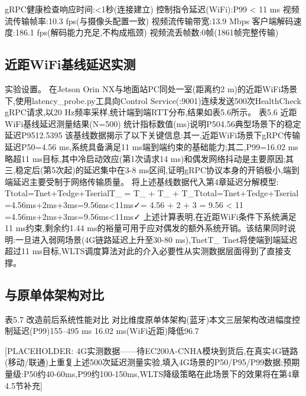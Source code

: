gRPC健康检查响应时间:<1秒(连接建立)
控制指令延迟(WiFi):P99 < 11 ms
视频流传输帧率:10.3 fps(与摄像头配置一致)
视频流传输带宽:13.9 Mbps
客户端解码速度:186.1 fps(解码能力充足,不构成瓶颈)
视频流丢帧数:0帧(1861帧完整传输)
\subsection{近距WiFi基线延迟实测}
实验设置。 在Jetson Orin NX与地面站PC同处一室(距离约2 m)的近距WiFi场景下,使用latency_probe.py工具向Control Service(:9001)连续发送500次HealthCheck gRPC请求,以20 Hz频率采样,统计端到端RTT分布,结果如表5.6所示。
表5.6 近距WiFi基线延迟测量结果(N=500)
统计指标数值(ms)说明P504.56典型场景下的稳定延迟P9512.5395%
该基线数据揭示了以下关键信息:其一,近距WiFi场景下gRPC传输延迟P50=4.56 ms,系统具备满足11 ms端到端约束的基础能力;其二,P99=16.02 ms略超11 ms目标,其中冷启动效应(第1次请求14 ms)和偶发网络抖动是主要原因;其三,稳定后(第5次起)的延迟集中在3-8 ms区间,证明gRPC协议本身的开销极小,端到端延迟主要受制于网络传输质量。
将上述基线数据代入第4章延迟分解模型:
Ttotal=Tnet+Tedge+TserialT_{} = T_{} + T_{} + T_{}Ttotal​=Tnet​+Tedge​+Tserial​
=4.56ms+2ms+3ms=9.56ms<11ms✓= 4.56 + 2 + 3 = 9.56 < 11 \quad \checkmark=4.56ms+2ms+3ms=9.56ms<11ms✓
上述计算表明,在近距WiFi条件下系统满足11 ms约束,剩余约1.44 ms的裕量可用于应对偶发的额外系统开销。该结果同时说明:一旦进入弱网场景(4G链路延迟上升至30-80 ms),TnetT_{}
Tnet将使端到端延迟超过11 ms目标,WLTS调度算法对此的介入必要性从实测数据层面得到了直接支撑。

\subsection{与原单体架构对比}

表5.7 改造前后系统性能对比
对比维度原单体架构(蓝牙)本文三层架构改进幅度控制延迟(P99)155–495 ms \cite{zhang2019bci}16.02 ms(WiFi近距)降低96.7%

[PLACEHOLDER: 4G实测数据——待EC200A-CNHA模块到货后,在真实4G链路(移动/联通)上重复上述500次延迟测量实验,填入4G场景的P50/P95/P99数据;预期量级:P50约40-60ms,P99约100-150ms,WLTS降级策略在此场景下的效果将在第4章4.5节补充]

